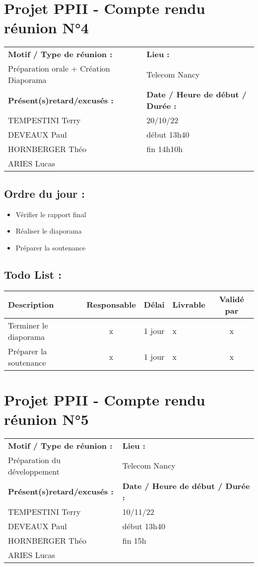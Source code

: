 \documentclass[12pt,titlepage]{report}
\begin{document}
\section*{Projet PPII - Compte rendu réunion N°4}
\begin{tabular}{|p{7cm}|p{6cm}|}
    \hline
    \textbf{Motif / Type de réunion :}
    & \textbf{Lieu :}
    \\
    Préparation orale + Création Diaporama
    & 
    Telecom Nancy
    \\ \hline
    \textbf{Présent(s)retard/excusés :}
    &
    \textbf{Date / Heure de début / Durée :}
    \\ 
    TEMPESTINI Terry &  20/10/22\\  
    DEVEAUX Paul & début 13h40\\
    HORNBERGER Théo & fin 14h10h\\
    ARIES Lucas & 
    \\ \hline
\end{tabular}

\subsection*{Ordre du jour :}
\begin{itemize}
    \item{Vérifier le rapport final}
    \item{Réaliser le diaporama}
    \item{Préparer la soutenance}
\end{itemize}

\subsection*{Todo List :}
\begin{tabular}{|p{3.5cm}|c|c|p{4.5cm}|c|}
    \hline 
    Description & Responsable & Délai & Livrable & Validé par 
    \\ \hline
    Terminer le diaporama & x & 1 jour & x & x
    \\ \hline
    Préparer la soutenance & x & 1 jour & x & x
    \\ \hline
\end{tabular}
\newpage

\section*{Projet PPII - Compte rendu réunion N°5}
\begin{tabular}{|p{7cm}|p{6cm}|}
    \hline
    \textbf{Motif / Type de réunion :}
    & \textbf{Lieu :}
    \\
    Préparation du développement
    & 
    Telecom Nancy
    \\ \hline
    \textbf{Présent(s)retard/excusés :}
    &
    \textbf{Date / Heure de début / Durée :}
    \\ 
    TEMPESTINI Terry &  10/11/22\\  
    DEVEAUX Paul & début 13h40\\
    HORNBERGER Théo & fin 15h\\
    ARIES Lucas & 
    \\ \hline
\end{tabular}
\end{document}
